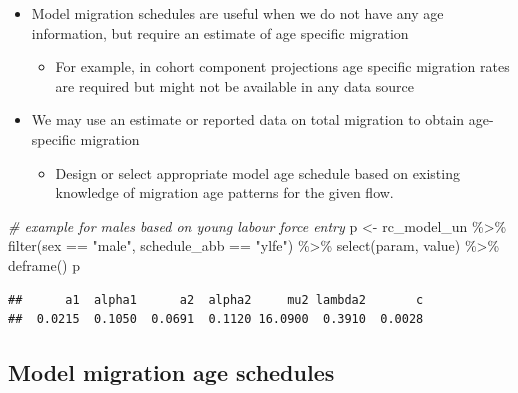 \documentclass[
]{book}
\newenvironment{Shaded}{\begin{snugshade}}{\end{snugshade}}
\newcommand{\CommentTok}[1]{\textcolor[rgb]{0.56,0.35,0.01}{\textit{#1}}}
\newcommand{\FunctionTok}[1]{\textcolor[rgb]{0.00,0.00,0.00}{#1}}
\newcommand{\NormalTok}[1]{#1}
\newcommand{\OtherTok}[1]{\textcolor[rgb]{0.56,0.35,0.01}{#1}}
\newcommand{\SpecialCharTok}[1]{\textcolor[rgb]{0.00,0.00,0.00}{#1}}
\newcommand{\StringTok}[1]{\textcolor[rgb]{0.31,0.60,0.02}{#1}}
\providecommand{\tightlist}{%
  \setlength{\itemsep}{0pt}\setlength{\parskip}{0pt}}
\begin{document}
\begin{itemize}
\tightlist
\item
  Model migration schedules are useful when we do not have any age information, but require an estimate of age specific migration

  \begin{itemize}
  \tightlist
  \item
    For example, in cohort component projections age specific migration rates are required but might not be available in any data source
  \end{itemize}
\item
  We may use an estimate or reported data on total migration to obtain age-specific migration

  \begin{itemize}
  \tightlist
  \item
    Design or select appropriate model age schedule based on existing knowledge of migration age patterns for the given flow.
  \end{itemize}
\end{itemize}

\begin{Shaded}
\begin{Highlighting}[]
\CommentTok{\# example for males based on young labour force entry}
\NormalTok{p }\OtherTok{\textless{}{-}}\NormalTok{ rc\_model\_un }\SpecialCharTok{\%\textgreater{}\%}
  \FunctionTok{filter}\NormalTok{(sex }\SpecialCharTok{==} \StringTok{"male"}\NormalTok{, schedule\_abb }\SpecialCharTok{==} \StringTok{"ylfe"}\NormalTok{) }\SpecialCharTok{\%\textgreater{}\%}
  \FunctionTok{select}\NormalTok{(param, value) }\SpecialCharTok{\%\textgreater{}\%}
  \FunctionTok{deframe}\NormalTok{()}
\NormalTok{p}
\end{Highlighting}
\end{Shaded}

\begin{verbatim}
##      a1  alpha1      a2  alpha2     mu2 lambda2       c 
##  0.0215  0.1050  0.0691  0.1120 16.0900  0.3910  0.0028
\end{verbatim}

\hypertarget{model-migration-age-schedules-9}{%
\subsection{Model migration age schedules}\label{model-migration-age-schedules-9}}
\end{document}
